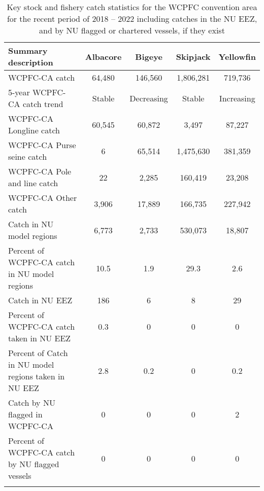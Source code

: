 \begin{longtable}{lcccc}
\caption{Key stock and fishery catch statistics for the WCPFC convention area for the recent period of 2018 -- 2022 including catches in the NU EEZ, and by NU flagged or chartered vessels, if they exist} \\ 
  \hline
Summary description & Albacore & Bigeye & Skipjack & Yellowfin \\ 
  \hline
WCPFC-CA catch & 64,480 & 146,560 & 1,806,281 & 719,736 \\ 
  5-year WCPFC-CA catch trend & Stable & Decreasing & Stable & Increasing \\ 
  WCPFC-CA Longline catch & 60,545 & 60,872 & 3,497 & 87,227 \\ 
  WCPFC-CA Purse seine catch & 6 & 65,514 & 1,475,630 & 381,359 \\ 
  WCPFC-CA Pole and line catch & 22 & 2,285 & 160,419 & 23,208 \\ 
  WCPFC-CA Other catch & 3,906 & 17,889 & 166,735 & 227,942 \\ 
  Catch in NU model regions & 6,773 & 2,733 & 530,073 & 18,807 \\ 
  Percent of WCPFC-CA catch in NU model regions & 10.5 & 1.9 & 29.3 & 2.6 \\ 
   \hline
Catch in NU EEZ & 186 & 6 & 8 & 29 \\ 
  Percent of WCPFC-CA catch taken in NU EEZ & 0.3 & 0 & 0 & 0 \\ 
  Percent of Catch in NU model regions taken in NU EEZ & 2.8 & 0.2 & 0 & 0.2 \\ 
  Catch by NU flagged in WCPFC-CA & 0 & 0 & 0 & 2 \\ 
  Percent of WCPFC-CA catch by NU flagged vessels & 0 & 0 & 0 & 0 \\ 
  \hline
\label{cat_sum_tab}
\end{longtable}
